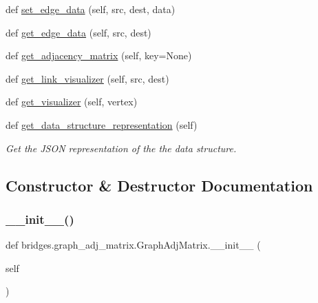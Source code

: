 \begin{DoxyCompactItemize}
\item 
def \mbox{\hyperlink{classbridges_1_1graph__adj__matrix_1_1_graph_adj_matrix_ac456de9923ee8d671d1b6d908568b1bc}{set\+\_\+edge\+\_\+data}} (self, src, dest, data)
\item 
def \mbox{\hyperlink{classbridges_1_1graph__adj__matrix_1_1_graph_adj_matrix_aa3b7bc3f06d00e9a67f8d1cf6793ad70}{get\+\_\+edge\+\_\+data}} (self, src, dest)
\item 
def \mbox{\hyperlink{classbridges_1_1graph__adj__matrix_1_1_graph_adj_matrix_aa64d4ed1525c6b4959269df0e4090e01}{get\+\_\+adjacency\+\_\+matrix}} (self, key=None)
\item 
def \mbox{\hyperlink{classbridges_1_1graph__adj__matrix_1_1_graph_adj_matrix_a7071cdb99fdd2afd558d19f1470b8c9f}{get\+\_\+link\+\_\+visualizer}} (self, src, dest)
\item 
def \mbox{\hyperlink{classbridges_1_1graph__adj__matrix_1_1_graph_adj_matrix_a96177ddfba9e474543b03d58fbc37e40}{get\+\_\+visualizer}} (self, vertex)
\item 
def \mbox{\hyperlink{classbridges_1_1graph__adj__matrix_1_1_graph_adj_matrix_a9e8f53fc0dcd724bb29502fe08ea837e}{get\+\_\+data\+\_\+structure\+\_\+representation}} (self)
\begin{DoxyCompactList}\small\item\em Get the J\+S\+ON representation of the the data structure. \end{DoxyCompactList}\end{DoxyCompactItemize}


\subsection{Constructor \& Destructor Documentation}
\mbox{\label{classbridges_1_1graph__adj__matrix_1_1_graph_adj_matrix_a77b2efa6f296054ada425ee61e0d22a8}} 
\subsubsection{\texorpdfstring{\_\_init\_\_()}{\_\_init\_\_()}}
{\footnotesize\ttfamily def bridges.\+graph\+\_\+adj\+\_\+matrix.\+Graph\+Adj\+Matrix.\+\_\+\+\_\+init\+\_\+\+\_\+ (\begin{DoxyParamCaption}\item[{}]{self }\end{DoxyParamCaption})}




